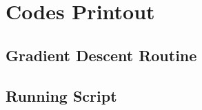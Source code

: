 \documentclass[11pt,a4paper]{article}
\begin{document}
\newpage
\appendix
\section{Codes Printout}

\subsection{Gradient Descent Routine}

\newpage

\subsection{Running Script}


\end{document}
